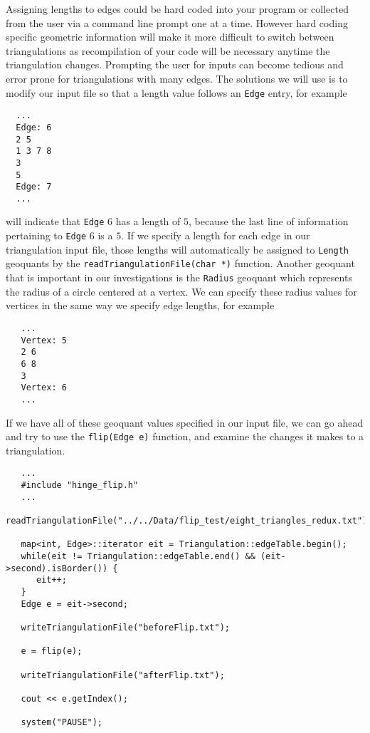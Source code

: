 \documentclass{amsart}
\theoremstyle{plain}
\numberwithin{equation}{section}
\begin{document}
Assigning lengths to edges could be hard coded into your program or collected from the user via a command line prompt one at a time. However hard coding specific geometric information will make it more difficult to switch between triangulations as recompilation of your code will be necessary anytime the triangulation changes. Prompting the user for inputs can become tedious and error prone for triangulations with many edges. The solutions we will use is to modify our input file so that a length value follows an \verb|Edge| entry, for example\\

\begin{verbatim}
  ...
  Edge: 6
  2 5
  1 3 7 8 
  3 
  5
  Edge: 7
  ...
\end{verbatim}

\bigskip

will indicate that \verb|Edge| $6$ has a length of $5$, because the last line of information pertaining to \verb|Edge| $6$ is a $5$. If we specify a length for each edge in our triangulation input file, those lengths will automatically be assigned to \verb|Length| geoquants by the \verb|readTriangulationFile(char *)| function. Another geoquant that is important in our investigations is the \verb|Radius| geoquant which represents the radius of a circle centered at a vertex. We can specify these radius values for vertices in the same way we specify edge lengths, for example\\

\begin{verbatim}
   ...
   Vertex: 5
   2 6 
   6 8 
   3
   Vertex: 6
   ...
\end{verbatim}

If we have all of these geoquant values specified in our input file, we can go ahead and try to use the \verb|flip(Edge e)| function, and examine the changes it makes to a triangulation.

\begin{verbatim}
   ...
   #include "hinge_flip.h"
   ...
   readTriangulationFile("../../Data/flip_test/eight_triangles_redux.txt");

   map<int, Edge>::iterator eit = Triangulation::edgeTable.begin();
   while(eit != Triangulation::edgeTable.end() && (eit->second).isBorder()) {
      eit++;
   }
   Edge e = eit->second;

   writeTriangulationFile("beforeFlip.txt");

   e = flip(e);

   writeTriangulationFile("afterFlip.txt");
   
   cout << e.getIndex();
   
   system("PAUSE");
\end{verbatim}
\end{document}
